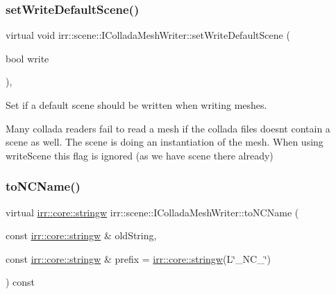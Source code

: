 \subsubsection{\texorpdfstring{set\+Write\+Default\+Scene()}{setWriteDefaultScene()}\hspace{0.1cm}{\footnotesize\ttfamily [2/2]}}
{\footnotesize\ttfamily virtual void irr\+::scene\+::\+I\+Collada\+Mesh\+Writer\+::set\+Write\+Default\+Scene (\begin{DoxyParamCaption}\item[{bool}]{write }\end{DoxyParamCaption})\hspace{0.3cm}{\ttfamily [inline]}, {\ttfamily [virtual]}}



Set if a default scene should be written when writing meshes. 

Many collada readers fail to read a mesh if the collada files doesn\textquotesingle{}t contain a scene as well. The scene is doing an instantiation of the mesh. When using write\+Scene this flag is ignored (as we have scene there already) \mbox{\label{classirr_1_1scene_1_1IColladaMeshWriter_ac9c48beab095aa6f4cb4f696bb2ecd45}} 
\subsubsection{\texorpdfstring{to\+N\+C\+Name()}{toNCName()}\hspace{0.1cm}{\footnotesize\ttfamily [1/2]}}
{\footnotesize\ttfamily virtual \hyperlink{namespaceirr_1_1core_a5aedb62cb47cf01d1c548ab5e6344d2d}{irr\+::core\+::stringw} irr\+::scene\+::\+I\+Collada\+Mesh\+Writer\+::to\+N\+C\+Name (\begin{DoxyParamCaption}\item[{const \hyperlink{namespaceirr_1_1core_a5aedb62cb47cf01d1c548ab5e6344d2d}{irr\+::core\+::stringw} \&}]{old\+String,  }\item[{const \hyperlink{namespaceirr_1_1core_a5aedb62cb47cf01d1c548ab5e6344d2d}{irr\+::core\+::stringw} \&}]{prefix = {\ttfamily \hyperlink{namespaceirr_1_1core_a5aedb62cb47cf01d1c548ab5e6344d2d}{irr\+::core\+::stringw}(L\char`\"{}\+\_\+NC\+\_\+\char`\"{})} }\end{DoxyParamCaption}) const\hspace{0.3cm}{\ttfamily [pure virtual]}}



